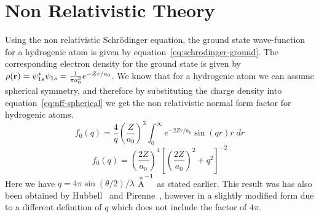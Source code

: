 
\section{Non Relativistic Theory}

    Using the non relativistic Schr\"odinger equation, the ground state
    wave-function for a hydrogenic atom is given by
    equation~\ref{eq:schrodinger-ground}.
    The corresponding electron density for the ground state is given by
    \(
        \rho(\mathbf{r}) = \psi_{1s}^{*} \psi_{1s} 
                     = \frac{1}{\pi a_{0}^{3}} e^{-Zr/a_0}
    \).
    We know that for a hydrogenic atom we can assume spherical symmetry,
    and therefore by substituting the charge density into
    equation~\ref{eq:nff-spherical} we get the non relativistic normal 
    form factor for hydrogenic atoms.
    \begin{equation*}
        f_0(q) = \frac{4}{q} \left( \frac{Z}{a_0} \right)^3
                 \int_0^\infty e^{-2Zr/a_0} \sin(qr) r \; dr
    \end{equation*}
    \begin{equation} \label{eq:nff-nonrelativistic}
        \boxed{
            f_0(q) = \left( \frac{2Z}{a_0} \right)^4 
                     \left[ \left( \frac{2Z}{a_0} \right)^2 + q^2 \right]^{-2} 
        }
    \end{equation}
    Here we have $q = 4\pi \sin(\theta/2)/\lambda$ $\stackrel{\circ}{\mathrm{A}}^{-1}$ as stated earlier. This
    result was has also been obtained by Hubbell~\cite{Hubbell-1975} and
    Pirenne~\cite{Pirenne}, however in a slightly modified form due to a
    different definition of $q$ which does not include the factor of $4\pi$.
